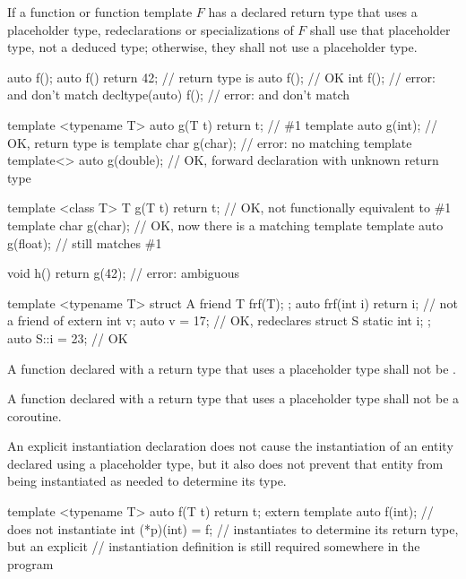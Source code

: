 \pnum
If a function or function template $F$ has
a declared return type that uses a placeholder type,
redeclarations or specializations of $F$ shall use that
placeholder type, not a deduced type;
otherwise, they shall not use a placeholder type.
\begin{example}
\begin{codeblock}
auto f();
auto f() { return 42; }                         // return type is 
auto f();                                       // OK
int f();                                        // error:  and  don't match
decltype(auto) f();                             // error:  and  don't match

template <typename T> auto g(T t) { return t; } // \#1
template auto g(int);                           // OK, return type is 
template char g(char);                          // error: no matching template
template<> auto g(double);                      // OK, forward declaration with unknown return type

template <class T> T g(T t) { return t; }       // OK, not functionally equivalent to \#1
template char g(char);                          // OK, now there is a matching template
template auto g(float);                         // still matches \#1

void h() { return g(42); }                      // error: ambiguous

template <typename T> struct A {
  friend T frf(T);
};
auto frf(int i) { return i; }                   // not a friend of 
extern int v;
auto v = 17;                                    // OK, redeclares 
struct S {
  static int i;
};
auto S::i = 23;                                 // OK
\end{codeblock}
\end{example}

\pnum
A function declared with a return type that uses a placeholder type shall not
be .

\pnum
A function declared with a return type that uses a placeholder type shall not
be a coroutine.

\pnum
An explicit instantiation declaration does not cause the
instantiation of an entity declared using a placeholder type, but it also does
not prevent that entity from being instantiated as needed to determine its
type.
\begin{example}
\begin{codeblock}
template <typename T> auto f(T t) { return t; }
extern template auto f(int);    // does not instantiate 
int (*p)(int) = f;              // instantiates  to determine its return type, but an explicit
                                // instantiation definition is still required somewhere in the program
\end{codeblock}
\end{example}

